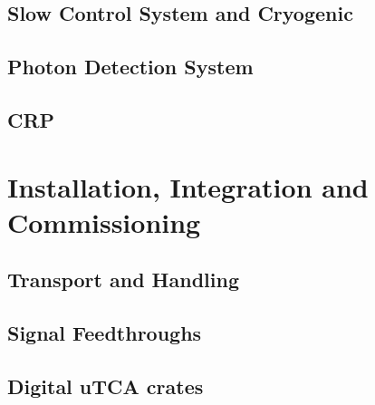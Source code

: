 \subsection{Slow Control System and Cryogenic}
\label{sec:fddp-tpc-elec-intfc-sc}

\subsection{Photon Detection System}
\label{sec:fddp-tpc-elec-intfc-pmt}

\subsection{CRP}
\label{sec:fddp-tpc-elec-intfc-crp}







\section{Installation, Integration and Commissioning}
\label{sec:fddp-tpc-elec-install}

\subsection{Transport and Handling}
\label{sec:fddp-tpc-elec-install-transport}


\subsection{Signal Feedthroughs}
\label{sec:fddp-tpc-elec-install-sft}

\subsection{Digital uTCA crates}
\label{sec:fddp-tpc-elec-install-utca}

